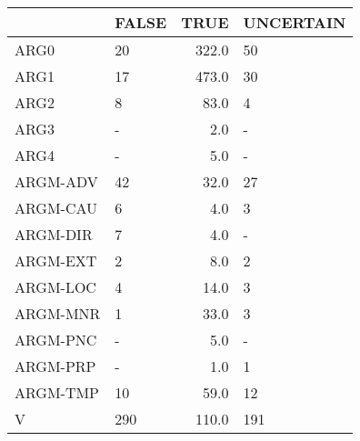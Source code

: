 \begin{tabular}{llrl}
\toprule
{} & FALSE &   TRUE & UNCERTAIN \\
\midrule
ARG0     &    20 &  322.0 &        50 \\
ARG1     &    17 &  473.0 &        30 \\
ARG2     &     8 &   83.0 &         4 \\
ARG3     &     - &    2.0 &         - \\
ARG4     &     - &    5.0 &         - \\
ARGM-ADV &    42 &   32.0 &        27 \\
ARGM-CAU &     6 &    4.0 &         3 \\
ARGM-DIR &     7 &    4.0 &         - \\
ARGM-EXT &     2 &    8.0 &         2 \\
ARGM-LOC &     4 &   14.0 &         3 \\
ARGM-MNR &     1 &   33.0 &         3 \\
ARGM-PNC &     - &    5.0 &         - \\
ARGM-PRP &     - &    1.0 &         1 \\
ARGM-TMP &    10 &   59.0 &        12 \\
V        &   290 &  110.0 &       191 \\
\bottomrule
\end{tabular}
